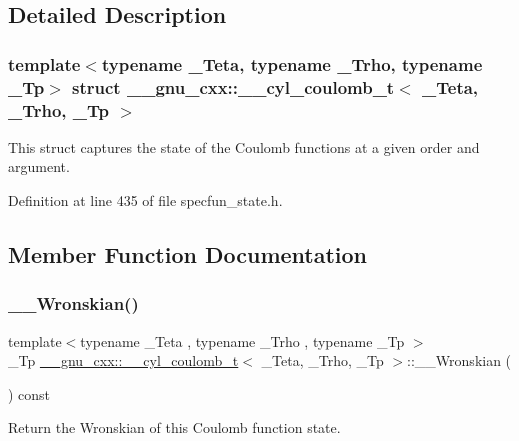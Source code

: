 \subsection{Detailed Description}
\subsubsection*{template$<$typename \+\_\+\+Teta, typename \+\_\+\+Trho, typename \+\_\+\+Tp$>$\newline
struct \+\_\+\+\_\+gnu\+\_\+cxx\+::\+\_\+\+\_\+cyl\+\_\+coulomb\+\_\+t$<$ \+\_\+\+Teta, \+\_\+\+Trho, \+\_\+\+Tp $>$}

This struct captures the state of the Coulomb functions at a given order and argument. 

Definition at line 435 of file specfun\+\_\+state.\+h.



\subsection{Member Function Documentation}
\mbox{\label{struct____gnu__cxx_1_1____cyl__coulomb__t_a7ce3df5dd80026df89e43b37c9efe36f}} 
\subsubsection{\texorpdfstring{\+\_\+\+\_\+\+Wronskian()}{\_\_Wronskian()}}
{\footnotesize\ttfamily template$<$typename \+\_\+\+Teta , typename \+\_\+\+Trho , typename \+\_\+\+Tp $>$ \\
\+\_\+\+Tp \hyperlink{struct____gnu__cxx_1_1____cyl__coulomb__t}{\+\_\+\+\_\+gnu\+\_\+cxx\+::\+\_\+\+\_\+cyl\+\_\+coulomb\+\_\+t}$<$ \+\_\+\+Teta, \+\_\+\+Trho, \+\_\+\+Tp $>$\+::\+\_\+\+\_\+\+Wronskian (\begin{DoxyParamCaption}{ }\end{DoxyParamCaption}) const\hspace{0.3cm}{\ttfamily [inline]}}



Return the Wronskian of this Coulomb function state. 



